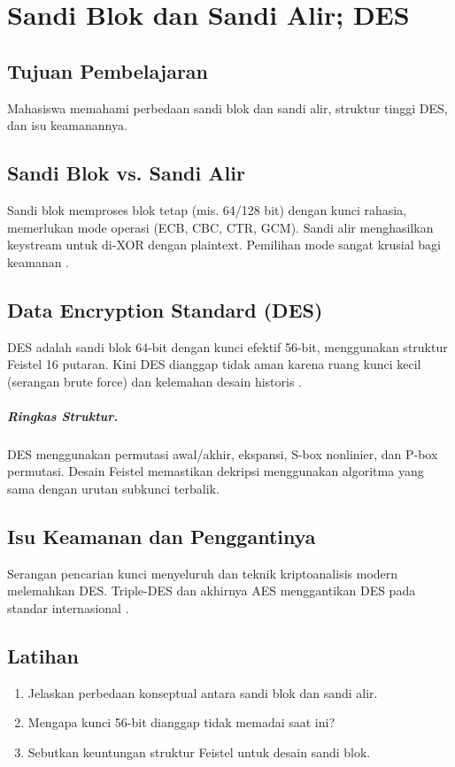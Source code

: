 \documentclass[../main.tex]{subfiles}
\begin{document}
\chapter{Sandi Blok dan Sandi Alir; DES}

\section{Tujuan Pembelajaran}
Mahasiswa memahami perbedaan sandi blok dan sandi alir, struktur tinggi DES, dan isu keamanannya.

\section{Sandi Blok vs. Sandi Alir}
Sandi blok memproses blok tetap (mis. 64/128 bit) dengan kunci rahasia, memerlukan mode operasi (ECB, CBC, CTR, GCM). Sandi alir menghasilkan keystream untuk di-XOR dengan plaintext. Pemilihan mode sangat krusial bagi keamanan \citep{stallings,menezes}.

\section{Data Encryption Standard (DES)}
DES adalah sandi blok 64-bit dengan kunci efektif 56-bit, menggunakan struktur Feistel 16 putaran. Kini DES dianggap tidak aman karena ruang kunci kecil (serangan brute force) dan kelemahan desain historis \citep{nist_des,stallings}.

\paragraph{Ringkas Struktur.} DES menggunakan permutasi awal/akhir, ekspansi, S-box nonlinier, dan P-box permutasi. Desain Feistel memastikan dekripsi menggunakan algoritma yang sama dengan urutan subkunci terbalik.

\section{Isu Keamanan dan Penggantinya}
Serangan pencarian kunci menyeluruh dan teknik kriptoanalisis modern melemahkan DES. Triple-DES dan akhirnya AES menggantikan DES pada standar internasional \citep{nist_des,nist_aes}.

\section{Latihan}
\begin{enumerate}
  \item Jelaskan perbedaan konseptual antara sandi blok dan sandi alir.
  \item Mengapa kunci 56-bit dianggap tidak memadai saat ini?
  \item Sebutkan keuntungan struktur Feistel untuk desain sandi blok.
\end{enumerate}
\end{document}
